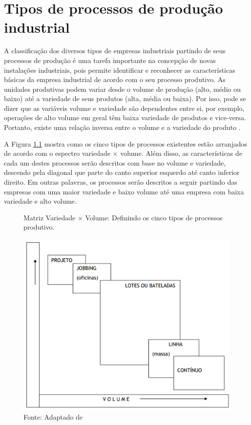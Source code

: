 \chapter{Tipos de processos de produção industrial}
\label{chap:tipos_de_processo_de_producao}

A classificação dos diversos tipos de empresas industriais partindo de seus processos de produção é uma tarefa importante na concepção de novas instalações industriais, pois permite identificar e reconhecer as características básicas da empresa industrial de acordo com o seu processo produtivo. As unidades produtivas podem variar desde o volume de produção (alto, médio ou baixo) até a variedade de seus produtos (alta, média ou baixa). Por isso, pode se dizer que as variáveis volume e variedade são dependentes entre si, por exemplo, operações de alto volume em geral têm baixa variedade de produtos e vice-versa. Portanto, existe uma relação inversa entre o volume e a variedade do produto \cite{slack2009administracao}.

A Figura \ref{fig:tipos_de_processo_de_producao} mostra como os cinco tipos de processos existentes estão arranjados de acordo com o espectro variedade $\times$ volume. Além disso, as características de cada um destes processos serão descritos com base no volume e variedade, descendo pela diagonal que parte do canto superior esquerdo até canto inferior direito. Em outras palavras, os processos serão descritos a seguir partindo das empresas com uma maior variedade e baixo volume até uma empresa com baixa variedade e alto volume.

\begin{figure}[H]
  \centering
  \caption{Matriz Variedade $\times$ Volume: Definindo os cinco tipos de processos produtivo.} %
  \includegraphics[width=.7\textwidth]{images/tiposdeprocesso.png}
  \caption*{Fonte: Adaptado de \cite{slack2009administracao}}
  \label{fig:tipos_de_processo_de_producao}
\end{figure}

